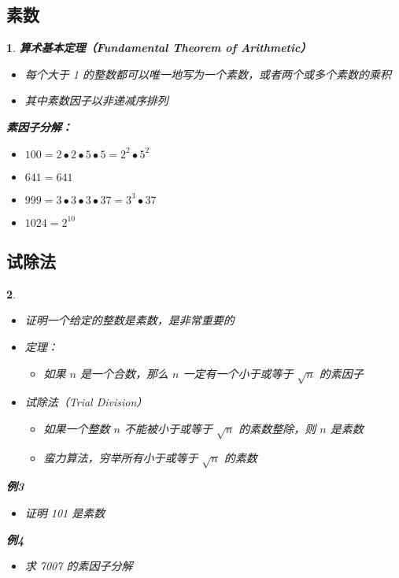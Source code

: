 \documentclass[UTF8]{report}
\theoremstyle{MyLineTheoremStyle} %
\theoremstyle{MyBlockTheoremStyle} %
\theoremstyle{MySubsubsectionStyle} %
\newtheorem{definition}{}
\begin{document}
\subsection{素数}
\begin{definition}
    \textbf{算术基本定理（Fundamental Theorem of Arithmetic）}
    \begin{itemize}
        \item 每个大于 1 的整数都可以唯一地写为一个素数，或者两个或多个素数的乘积
        \item 其中素数因子以非递减序排列
    \end{itemize}

    \textbf{素因子分解：}
    \begin{itemize}
        \item $100 = 2 ∙ 2 ∙ 5 ∙ 5 = 2^2 ∙ 5^2$
        \item $641 = 641$
        \item $999 = 3 ∙ 3 ∙ 3 ∙ 37 = 3^3 ∙ 37$
        \item $1024 = 2^{10}$
    \end{itemize}
\end{definition}

\subsection{试除法}
\begin{definition}
    \begin{itemize}
        \item 证明一个给定的整数是素数，是非常重要的
        \item 定理：
        \begin{itemize}
            \item 如果 $n$ 是一个合数，那么 $n$ 一定有一个小于或等于 $\sqrt{n}$ 的素因子
        \end{itemize}
        \item 试除法（Trial Division）
        \begin{itemize}
            \item 如果一个整数 $n$ 不能被小于或等于 $\sqrt{n}$ 的素数整除，则 $n$ 是素数
            \item 蛮力算法，穷举所有小于或等于 $\sqrt{n}$ 的素数
        \end{itemize}
    \end{itemize}

    \textbf{例3}
    \begin{itemize}
        \item 证明 101 是素数
    \end{itemize}

    \textbf{例4}
    \begin{itemize}
        \item 求 7007 的素因子分解
    \end{itemize}
\end{definition}
\end{document}
